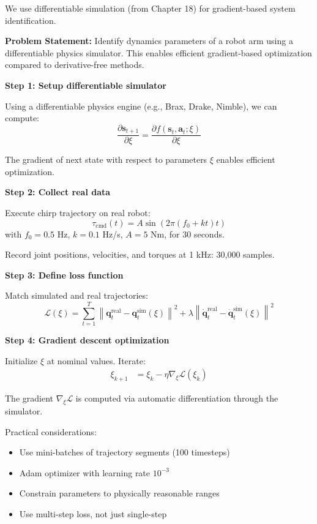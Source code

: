 \begin{example}
\label{ex:diff_sim_sysid}
We use differentiable simulation (from Chapter 18) for gradient-based system identification.

\textbf{Problem Statement:}
Identify dynamics parameters of a robot arm using a differentiable physics simulator. This enables efficient gradient-based optimization compared to derivative-free methods.

\textbf{Step 1: Setup differentiable simulator}

Using a differentiable physics engine (e.g., Brax, Drake, Nimble), we can compute:
\begin{equation}
\frac{\partial \mathbf{s}_{t+1}}{\partial \xi} = \frac{\partial f(\mathbf{s}_t, \mathbf{a}_t; \xi)}{\partial \xi}
\end{equation}

The gradient of next state with respect to parameters $\xi$ enables efficient optimization.

\textbf{Step 2: Collect real data}

Execute chirp trajectory on real robot:
\begin{equation}
\tau_{\text{cmd}}(t) = A \sin(2\pi (f_0 + kt)t)
\end{equation}
with $f_0 = 0.5$ Hz, $k = 0.1$ Hz/s, $A = 5$ Nm, for 30 seconds.

Record joint positions, velocities, and torques at 1 kHz: 30,000 samples.

\textbf{Step 3: Define loss function}

Match simulated and real trajectories:
\begin{equation}
\mathcal{L}(\xi) = \sum_{t=1}^{T} \left\| \mathbf{q}_t^{\text{real}} - \mathbf{q}_t^{\text{sim}}(\xi) \right\|^2 + \lambda \left\| \dot{\mathbf{q}}_t^{\text{real}} - \dot{\mathbf{q}}_t^{\text{sim}}(\xi) \right\|^2
\end{equation}

\textbf{Step 4: Gradient descent optimization}

Initialize $\xi$ at nominal values. Iterate:
\begin{align}
\xi_{k+1} &= \xi_k - \eta \nabla_\xi \mathcal{L}(\xi_k)
\end{align}

The gradient $\nabla_\xi \mathcal{L}$ is computed via automatic differentiation through the simulator.

Practical considerations:
\begin{itemize}
    \item Use mini-batches of trajectory segments (100 timesteps)
    \item Adam optimizer with learning rate $10^{-3}$
    \item Constrain parameters to physically reasonable ranges
    \item Use multi-step loss, not just single-step
\end{itemize}


\end{example}
